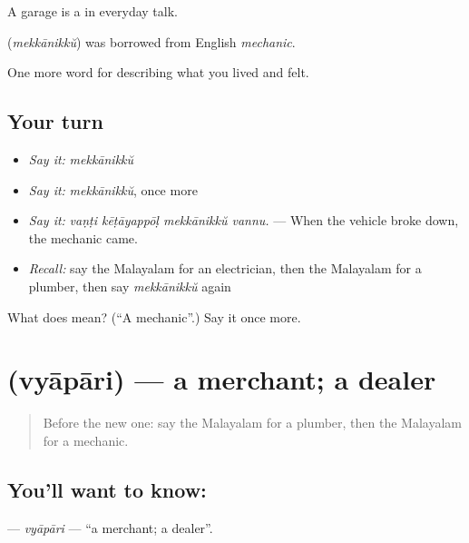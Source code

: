 A garage is a  in everyday talk.

\begin{cousinweb}
\textbf{} (\emph{mekkānikkŭ}) was borrowed from English \emph{mechanic}.
\end{cousinweb}

\begin{grammarlens}[title={What you've built}]
One more word for describing what you lived and felt.
\end{grammarlens}

\subsection*{Your turn}
\begin{itemize}
\raggedright
  \item \emph{Say it:} \emph{mekkānikkŭ}
  \item \emph{Say it:} \emph{mekkānikkŭ}, once more
  \item \emph{Say it:} \emph{vaṇṭi kēṭāyappōḷ mekkānikkŭ vannu.} — When the vehicle broke down, the mechanic came.
  \item \emph{Recall:} say the Malayalam for an electrician, then the Malayalam for a plumber, then say \emph{mekkānikkŭ} again
\end{itemize}

\begin{tcolorbox}[breakable,colback=teal!4,colframe=teal!35!black,title={Before you move on}]
What does  mean? (\textquotedblleft{}A mechanic\textquotedblright{}.) Say it once more.
\end{tcolorbox}
\section[\texorpdfstring{\ml{വ്യാപാരി} (vyāpāri)}{വ്യാപാരി (vyāpāri)}]{ (vyāpāri) — a merchant; a dealer}

\label{lesson:ML-C548-vyapari}



\begin{quote}
Before the new one: say the Malayalam for a plumber, then the Malayalam for a mechanic.
\end{quote}

\subsection*{You'll want to know: }
\textbf{} — \emph{vyāpāri} — \textquotedblleft{}a merchant; a dealer\textquotedblright{}.

